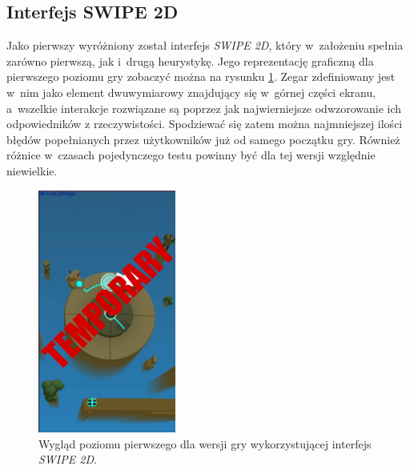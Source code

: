 \documentclass[a4paper,12pt,numbers=noenddot]{report}
\begin{document}
\subsection{Interfejs SWIPE 2D}
Jako pierwszy wyróżniony został interfejs \textit{SWIPE 2D}, który w~założeniu spełnia zarówno pierwszą, jak i~drugą heurystykę. Jego reprezentację graficzną dla pierwszego poziomu gry zobaczyć można na rysunku \ref{fig:interface_swipe_2d}. Zegar zdefiniowany jest w~nim jako element dwuwymiarowy znajdujący się w~górnej części ekranu, a~wszelkie interakcje rozwiązane są poprzez jak najwierniejsze odwzorowanie ich odpowiedników z rzeczywistości. Spodziewać się zatem można najmniejszej ilości błędów popełnianych przez użytkowników już od samego początku gry. Również różnice w~czasach pojedynczego testu powinny być dla tej wersji względnie niewielkie.
\begin{figure}[h!]
	\centering
  	\includegraphics[height=8cm]{fig/tmp.jpg}
	\caption{Wygląd poziomu pierwszego dla wersji gry wykorzystującej interfejs \textit{SWIPE 2D}.}
	\label{fig:interface_swipe_2d}
\end{figure}
\end{document}
